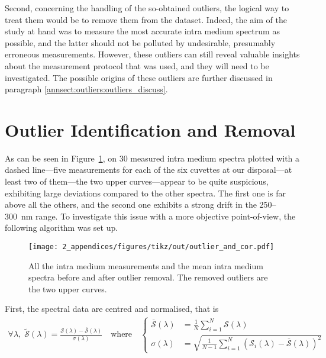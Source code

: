 Second, concerning the handling of the so-obtained outliers, the logical way to treat them would be to remove them from the dataset. Indeed, the aim of the study at hand was to measure the most accurate intra medium spectrum as possible, and the latter should not be polluted by undesirable, presumably erroneous measurements. However, these outliers can still reveal valuable insights about the measurement protocol that was used, and they will need to be investigated. The possible origins of these outliers are further discussed in paragraph \ref{annsect:outliers:outliers_discuss}.

\section{Outlier Identification and Removal}\label{par:outliers_id}

As can be seen in Figure~\ref{annfig:outlier:outlier_and_cor}, on 30 measured intra medium spectra plotted with a dashed line---five measurements for each of the six cuvettes at our disposal---at least two of them---the two upper curves---appear to be quite suspicious, exhibiting large deviations compared to the other spectra. The first one is far above all the others, and the second one exhibits a strong drift in the 250--300~nm range. To investigate this issue with a more objective point-of-view, the following algorithm was set up.

\begin{figure}
	\centering
	\texttt{[image: 2\_appendices/figures/tikz/out/outlier\_and\_cor.pdf]}
	\caption[Intra medium measurements and mean spectra before and after outlier removal.]{All the intra medium measurements and the mean intra medium spectra before and after outlier removal. The removed outliers are the two upper curves.}
	\label{annfig:outlier:outlier_and_cor}
\end{figure}

First, the spectral data are centred and normalised, that is
\begin{equation}
	\begin{split}
		\forall \lambda,\; \widetilde{\mathcal{S}}(\lambda) = \frac{\mathcal{S}(\lambda) - \overline{\mathcal{S}}(\lambda)}{\sigma(\lambda)} \quad
		\text{where}\quad
		\begin{cases}
			\overline{\mathcal{S}}(\lambda)& = \frac{1}{N} \sum_{i=1}^{N} \mathcal{S}(\lambda)\\
			\sigma(\lambda)& = \sqrt{\frac{1}{N-1}\sum_{i=1}^{N} (\mathcal{S}_{i}(\lambda) - \overline{\mathcal{S}}(\lambda))^2}
		\end{cases}
	\end{split}
\end{equation}

